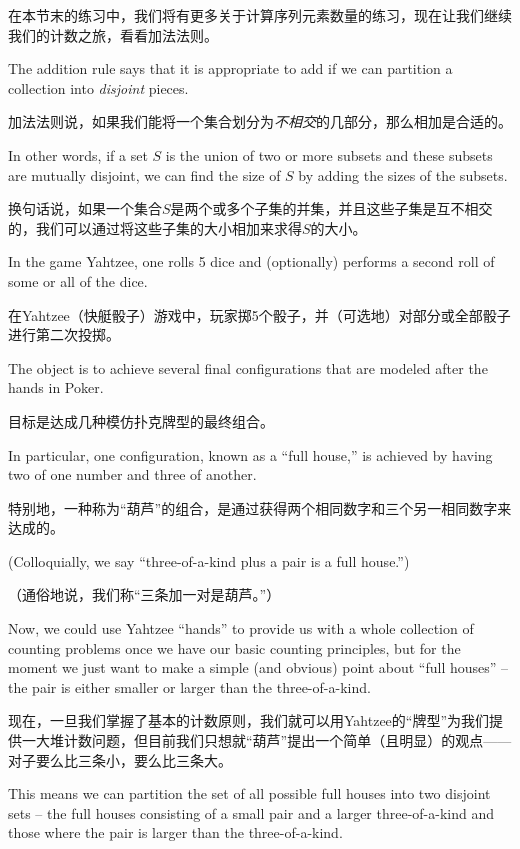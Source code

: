 在本节末的练习中，我们将有更多关于计算序列元素数量的练习，现在让我们继续我们的计数之旅，看看加法法则。

The addition rule says that it is appropriate to add if we can 
partition a collection into \emph{disjoint} pieces.

加法法则说，如果我们能将一个集合划分为\emph{不相交}的几部分，那么相加是合适的。

In other words,
if a set $S$ is the union of two or more subsets and these subsets 
are mutually disjoint, we can find the size of $S$ by adding the sizes
of the subsets.

换句话说，如果一个集合$S$是两个或多个子集的并集，并且这些子集是互不相交的，我们可以通过将这些子集的大小相加来求得$S$的大小。

In the game Yahtzee, one rolls 5 dice and (optionally) performs a 
second roll of some or all of the dice.

在Yahtzee（快艇骰子）游戏中，玩家掷5个骰子，并（可选地）对部分或全部骰子进行第二次投掷。

The object is to achieve 
several final configurations that are modeled after the hands in
Poker.

目标是达成几种模仿扑克牌型的最终组合。

In particular, one configuration, known as a ``full house,''
is achieved by having two of one number and three of another.

特别地，一种称为“葫芦”的组合，是通过获得两个相同数字和三个另一相同数字来达成的。

(Colloquially, we say ``three-of-a-kind plus a pair is a full house.'')

（通俗地说，我们称“三条加一对是葫芦。”）

Now, we could use Yahtzee ``hands'' to provide us with a whole collection
of counting problems once we have our basic counting principles,
but for the moment we just want to make a simple (and obvious) point
about ``full houses'' -- the pair is either smaller or larger than
the three-of-a-kind.

现在，一旦我们掌握了基本的计数原则，我们就可以用Yahtzee的“牌型”为我们提供一大堆计数问题，但目前我们只想就“葫芦”提出一个简单（且明显）的观点——对子要么比三条小，要么比三条大。

This means we can partition the set of all possible
full houses into two disjoint sets -- the full houses consisting of a small
pair and a larger three-of-a-kind and those where the pair is larger 
than the three-of-a-kind.

